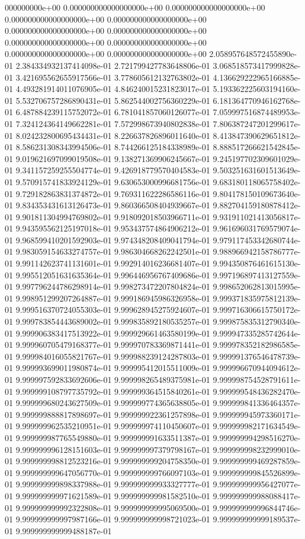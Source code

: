 000000000e+00	0.000000000000000000e+00	0.000000000000000000e+00	0.000000000000000000e+00	0.000000000000000000e+00	0.000000000000000000e+00	0.000000000000000000e+00	0.000000000000000000e+00	0.000000000000000000e+00	0.000000000000000000e+00	0.000000000000000000e+00	2.058957648572455890e-01	2.384334932137414098e-01	2.721799427783648806e-01	3.068518573417999828e-01	3.421695562655917566e-01	3.778605612132763802e-01	4.136629222965166885e-01	4.493281914011076905e-01	4.846240015231823017e-01	5.193362225603194160e-01	5.532706757286890431e-01	5.862544002756360229e-01	6.181364770946162768e-01	6.487884239115752072e-01	6.781041857060126077e-01	7.059997516874489953e-01	7.324124364149662281e-01	7.572998673940802838e-01	7.806387247201299617e-01	8.024232800695434431e-01	8.226637826896011640e-01	8.413847390629651812e-01	8.586231308343994506e-01	8.744266125184338989e-01	8.888517266621542845e-01	9.019621697099019508e-01	9.138271369906245667e-01	9.245197702309601029e-01	9.341157259255504774e-01	9.426918779570404583e-01	9.503251631601513649e-01	9.570915741833924129e-01	9.630653000996681756e-01	9.683180118065758402e-01	9.729182863831374872e-01	9.769311622286586116e-01	9.804178150109673640e-01	9.834353431613126473e-01	9.860366508404939667e-01	9.882704159180878412e-01	9.901811304994769802e-01	9.918092018503966711e-01	9.931911021413056817e-01	9.943595562125197018e-01	9.953437574864906212e-01	9.961696031769579074e-01	9.968599410201592903e-01	9.974348208409041794e-01	9.979117453342680744e-01	9.983059154633274757e-01	9.986304668262242501e-01	9.988966942158786777e-01	9.991142623741131601e-01	9.992914016236681407e-01	9.994350876461615130e-01	9.995512051631635364e-01	9.996446956767409686e-01	9.997196897413127559e-01	9.997796244786298914e-01	9.998273472207804824e-01	9.998652062813015995e-01	9.998951299207264887e-01	9.999186945986326958e-01	9.999371835975812139e-01	9.999516370724055303e-01	9.999628945275924607e-01	9.999716306615750172e-01	9.999783854443689002e-01	9.999835892180535257e-01	9.999875835312790340e-01	9.999906383417513922e-01	9.999929661463580199e-01	9.999947335285742644e-01	9.999960705479168377e-01	9.999970783369871441e-01	9.999978352182986585e-01	9.999984016055821767e-01	9.999988239124287803e-01	9.999991376546478739e-01	9.999993699011980874e-01	9.999995412015511009e-01	9.999996670944094612e-01	9.999997592833692606e-01	9.999998265489375981e-01	9.999998754528791611e-01	9.999999108797735792e-01	9.999999364515840261e-01	9.999999548436282470e-01	9.999999680243627509e-01	9.999999774365638805e-01	9.999999841336464357e-01	9.999999888817898697e-01	9.999999922361257898e-01	9.999999945973360171e-01	9.999999962535210951e-01	9.999999974110450607e-01	9.999999982171634549e-01	9.999999987765549880e-01	9.999999991633511387e-01	9.999999994298516270e-01	9.999999996128151603e-01	9.999999997379798167e-01	9.999999998232999010e-01	9.999999998812523216e-01	9.999999999204758350e-01	9.999999999469287859e-01	9.999999999647056770e-01	9.999999999766097103e-01	9.999999999845526899e-01	9.999999999898337988e-01	9.999999999933327777e-01	9.999999999956427077e-01	9.999999999971621589e-01	9.999999999981582510e-01	9.999999999988088417e-01	9.999999999992322808e-01	9.999999999995069500e-01	9.999999999996844746e-01	9.999999999997987166e-01	9.999999999998721023e-01	9.999999999999189537e-01	9.999999999999488187e-01
